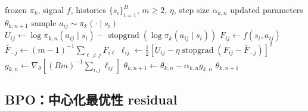\begin{algorithm}[ht]
\caption{PMD-Mean inner update\\{\small\textit{Semantics: 中心化 target 在指数归一化集合上的投影}}}
\begin{algorithmic}[1]
\Require frozen $\pi_k$, signal $f$, histories $\{s_i\}_{i=1}^{B}$, $m\ge2$, $\eta$, step size $\alpha_{k,n}$
\Ensure updated parameters $\theta_{k,n+1}$
        \State sample $a_{ij}\sim\pi_k(\cdot\mid s_i)$
        \State $U_{ij}\gets\log\pi_{k,n}(a_{ij}\mid s_i)-\operatorname{stopgrad}(\log\pi_k(a_{ij}\mid s_i))$
        \State $F_{ij}\gets f(s_i,a_{ij})$
    \EndFor
        \State $\bar F_{-j}\gets(m-1)^{-1}\sum_{\ell\ne j}F_{i\ell}$
        \State $\ell_{ij}\gets\frac12[U_{ij}-\eta\operatorname{stopgrad}(F_{ij}-\bar F_{-j})]^2$
    \EndFor
\EndFor
\State $g_{k,n}\gets\nabla_\theta[(Bm)^{-1}\sum_{i,j}\ell_{ij}]$
\State $\theta_{k,n+1}\gets\theta_{k,n}-\alpha_{k,n}g_{k,n}$
\State \Return $\theta_{k,n+1}$
\end{algorithmic}
\end{algorithm}


\subsection{BPO：中心化最优性 residual}
\label{sec:ch2-bpo}

